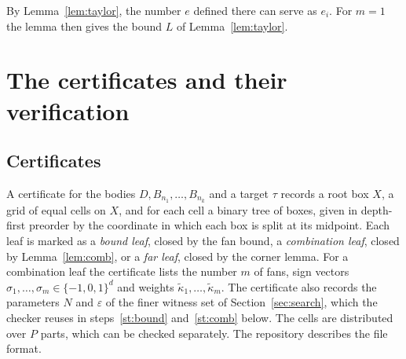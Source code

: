 \documentclass[11pt]{amsart}
\theoremstyle{definition}
\theoremstyle{remark}
\numberwithin{equation}{section}
\begin{document}
By Lemma~\ref{lem:taylor}, the number $e$ defined there can serve as $e_i$. For $m=1$ the lemma then gives the bound $L$ of Lemma~\ref{lem:taylor}.

\section{The certificates and their verification}\label{sec:cert}

\subsection{Certificates} A certificate for the bodies $D,B_{n_1},\dots,B_{n_k}$ and a target $\tau$ records a root box $X$, a grid of equal cells on $X$, and for each cell a binary tree of boxes, given in depth-first preorder by the coordinate in which each box is split at its midpoint. Each leaf is marked as a \emph{bound leaf}, closed by the fan bound, a \emph{combination leaf}, closed by Lemma~\ref{lem:comb}, or a \emph{far leaf}, closed by the corner lemma. For a combination leaf the certificate lists the number $m$ of fans, sign vectors $\sigma_1,\dots,\sigma_m\in\{-1,0,1\}^d$ and weights $\tilde\kappa_1,\dots,\tilde\kappa_m$. The certificate also records the parameters $N$ and $\varepsilon$ of the finer witness set of Section~\ref{sec:search}, which the checker reuses in steps~\ref{st:bound} and~\ref{st:comb} below. The cells are distributed over $P$ parts, which can be checked separately. The repository describes the file format.
\end{document}
